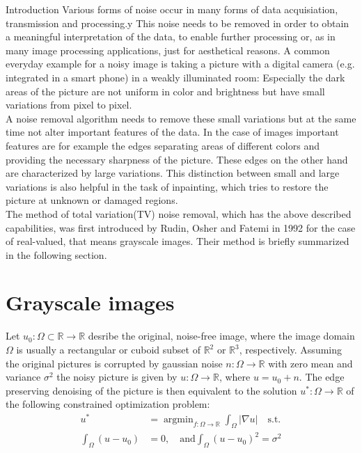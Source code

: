 \begin{chapter}{Introduction}
\label{ch:introduction}
Various forms of noise occur in many forms of data acquisiation, transmission and processing.y
This noise needs to be removed in order to obtain a meaningful interpretation of the data, to enable further processing or, as in many image processing 
applications, just for aesthetical reasons. A common everyday example for a noisy image is taking a picture with a digital camera (e.g. integrated in a smart phone) in a weakly illuminated room:
Especially the dark areas of the picture are not uniform in color and brightness but have small variations from pixel to pixel.\\

A noise removal algorithm needs to remove these small variations but at the same time not alter important features of the data. In the case of images important features are for example 
the edges separating areas of different colors and providing the necessary sharpness of the picture. These edges on the other hand are characterized by large variations. This distinction
between small and large variations is also helpful in the task of inpainting, which tries to restore the picture at unknown or damaged regions.\\

The method of total variation(TV) noise removal, which has the above described capabilities, was first introduced by Rudin, Osher and Fatemi \cite{RudinOsher} in 1992
for the case of real-valued, that means grayscale images. Their method is briefly summarized in the following section.

\section{Grayscale images}
Let $u_0: \Omega\subset \mathbb{R}\to \mathbb{R}$ desribe the original, noise-free image, where the image domain $\Omega$ is usually a rectangular or cuboid subset of $\mathbb{R}^2$ or $\mathbb{R}^3$, respectively. 
Assuming the original pictures is corrupted by gaussian noise $n: \Omega\to\mathbb{R}$ with zero mean and variance $\sigma^2$ the noisy picture is given by $u: \Omega\to \mathbb{R}$, where
$u = u_0 + n$. The edge preserving denoising of the picture is then equivalent to the solution $u^* :\Omega\to \mathbb{R}$ of the following constrained optimization problem:
\begin{align}
    \label{osher_opt}
    u^* &= \operatorname{argmin}_{f: \Omega\to \mathbb{R}}\int_\Omega\left\vert\nabla u\right\vert  \quad\text{s.t.}\\
    \int_\Omega(u-u_0) &= 0, \quad\text{and} \int_\Omega(u-u_0)^2 = \sigma^2
\end{align}


\end{chapter}
